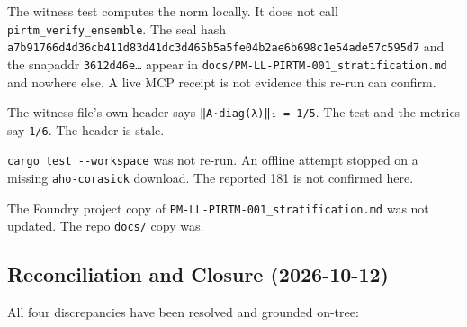 \documentclass[
]{article}
\begin{document}
The witness test computes the norm locally. It does not call
\texttt{pirtm\_verify\_ensemble}. The seal hash
\texttt{a7b91766d4d36cb411d83d41dc3d465b5a5fe04b2ae6b698c1e54ade57c595d7}
and the snapaddr \texttt{3612d46e…} appear in
\texttt{docs/PM-LL-PIRTM-001\_stratification.md} and nowhere else. A
live MCP receipt is not evidence this re-run can confirm.

The witness file's own header says \texttt{‖A·diag(λ)‖₁\ =\ 1/5}. The
test and the metrics say \texttt{1/6}. The header is stale.

\texttt{cargo\ test\ -\/-workspace} was not re-run. An offline attempt
stopped on a missing \texttt{aho-corasick} download. The reported 181 is
not confirmed here.

The Foundry project copy of \texttt{PM-LL-PIRTM-001\_stratification.md}
was not updated. The repo \texttt{docs/} copy was.

\hypertarget{reconciliation-and-closure-2026-10-12}{%
\subsection{Reconciliation and Closure
(2026-10-12)}\label{reconciliation-and-closure-2026-10-12}}

All four discrepancies have been resolved and grounded on-tree:
\end{document}
